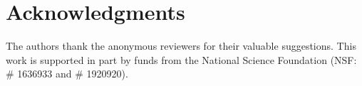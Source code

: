 \documentclass[unnumsec,webpdf,contemporary,large]{oup-authoring-template}%
\theoremstyle{thmstyleone}%
\theoremstyle{thmstyletwo}%
\theoremstyle{thmstylethree}%
\begin{document}
\section{Acknowledgments}
The authors thank the anonymous reviewers for their valuable suggestions. This work is supported in part by funds from the National Science Foundation (NSF: \# 1636933 and \# 1920920).





%
%




\end{document}
